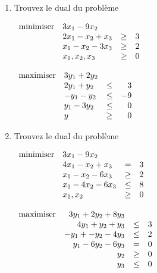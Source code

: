 \begin{enumerate}

  \item \label{e5.1} Trouvez le dual du problème

    $
    \begin{array}{llcr}
      \mbox{minimiser} & 3x_1-9x_2\\
      & 2x_1-x_2+x_3 & \geq & 3\\
      & x_1-x_2 -3x_3 & \geq & 2\\
      & x_1, x_2, x_3 & \geq & 0
    \end{array}
    $

    \begin{solution}
      $
      \begin{array}{llcr}
        \mbox{maximiser} & 3y_1 + 2y_2\\
        & 2y_1 + y_2 & \leq & 3\\
        & -y_1 - y_2 & \leq & -9\\
        & y_1 - 3y_2 & \leq & 0\\
        & y & \geq & 0
      \end{array}
      $
    \end{solution}


  \item Trouvez le dual du problème

    $
    \begin{array}{llcr}
      \mbox{minimiser} & 3x_1-9x_2\\
      & 4x_1-x_2+x_3 & = & 3\\
      & x_1-x_2 -6x_3 & \geq & 2\\
      & x_1-4x_2 -6x_3 & \leq & 8\\
      & x_1, x_2 & \geq & 0
    \end{array}
    $

    \begin{solution}
      $
      \begin{array}{lrcr}
        \maxi & 3y_1 + 2y_2 + 8y_3\\
        & 4y_1 + y_2 + y_3 & \leq & 3\\
        & -y_1 + -y_2 -4y_3 & \leq & 2\\
        & y_1 -6y_2 -6y_3 & = & 0\\
        & y_2 & \geq & 0\\
        & y_3 & \leq & 0

      \end{array}
      $
    \end{solution}



\end{enumerate}
